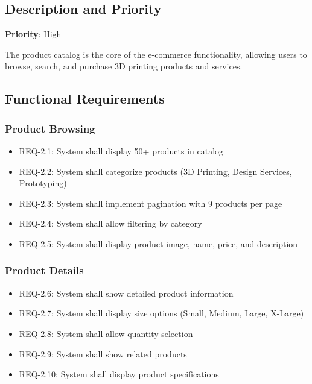 \documentclass{scrreprt}
\begin{document}
\subsection{Description and Priority}
\textbf{Priority}: High

The product catalog is the core of the e-commerce functionality, allowing users to browse, search, and purchase 3D printing products and services.

\subsection{Functional Requirements}

\subsubsection{Product Browsing}
\begin{itemize}
\item REQ-2.1: System shall display 50+ products in catalog
\item REQ-2.2: System shall categorize products (3D Printing, Design Services, Prototyping)
\item REQ-2.3: System shall implement pagination with 9 products per page
\item REQ-2.4: System shall allow filtering by category
\item REQ-2.5: System shall display product image, name, price, and description
\end{itemize}

\subsubsection{Product Details}
\begin{itemize}
\item REQ-2.6: System shall show detailed product information
\item REQ-2.7: System shall display size options (Small, Medium, Large, X-Large)
\item REQ-2.8: System shall allow quantity selection
\item REQ-2.9: System shall show related products
\item REQ-2.10: System shall display product specifications
\end{itemize}
\end{document}
